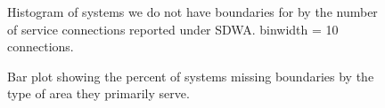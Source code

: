 \documentclass[
  letterpaper,
  DIV=11,
  numbers=noendperiod,
  oneside]{scrartcl}
\begin{document}
\begin{figure}


\caption{\label{fig-missingCon}Histogram of systems we do not have
boundaries for by the number of service connections reported under SDWA.
binwidth = 10 connections.}

\end{figure}%

\begin{figure}


\caption{\label{fig-missingType}Bar plot showing the percent of systems
missing boundaries by the type of area they primarily serve.}

\end{figure}%
\end{document}
